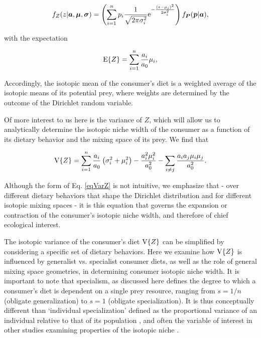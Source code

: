 \documentclass{article}
\begin{document}
\begin{equation}
  \label{eqfZ}
f_Z(z|{\bm a},{\bm \mu},{\bm \sigma}) = \left(\sum_{i=1}^n p_i\frac{1}{\sqrt{2 \pi \sigma_i^2}}{\rm e}^{-\frac{(z-\mu_i)^2}{2\sigma_i^2}}\right)f_{\bm P}(\bm p | \bm a),
\end{equation}


\noindent with the expectation

\begin{equation}
\label{eqEZ}
  {\rm E}\{Z\} = \sum_{i=1}^n \frac{a_i}{a_0} \mu_i,
\end{equation}

\noindent Accordingly, the isotopic mean of the consumer's diet is a weighted average of the isotopic means of its potential prey, where weights are determined by the outcome of the Dirichlet random variable.

Of more interest to us here is the variance of $Z$, which will allow us to analytically determine the isotopic niche width of the consumer as a function of its dietary behavior and the mixing space of its prey.
We find that

\begin{equation}
\label{eqVarZ}
  {\rm V}\{Z\} = \sum_{i=1}^n \frac{a_i}{a_0}\left(\sigma_i^2 + \mu_i^2\right) - \frac{a_i^2\mu_i^2}{a_0^2}-\sum_{i \neq j}\frac{a_i a_j \mu_i \mu_j}{a_0^2}.
\end{equation}

\noindent Although the form of Eq. \ref{eqVarZ} is not intuitive, we emphasize that - over different dietary behaviors that shape the Dirichlet distribution and for different isotopic mixing spaces - it is this equation that governs the expansion or contraction of the consumer's isotopic niche width, and therefore of chief ecological interest.

The isotopic variance of the consumer's diet ${\rm V}\{Z\}$ can be simplified by considering a specific set of dietary behaviors.
Here we examine how ${\rm V}\{Z\}$ is influenced by generalist vs. specialist consumer diets, as well as the role of general mixing space geometries, in determining consumer isotopic niche width.
It is important to note that specialism, as discussed here defines the degree to which a consumer's diet is dependent on a single prey resource, ranging from $s=1/n$ (obligate generalization) to $s=1$ (obligate specialization).
It is thus conceptually different than `individual specialization' defined as the proportional variance of an individual relative to that of its population \citep[Within-Individual Component / Total Niche Width, or WIC/TNW;][]{J:1979wc}, and often the variable of interest in other studies examining properties of the isotopic niche \citep{Araujo:2007iua,Araujo:2009p2286,Araujo:2011gm,Layman:2011cm}.
\end{document}
